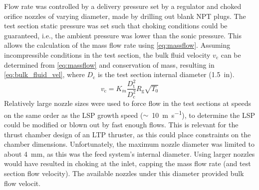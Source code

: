         Flow rate was controlled by a delivery pressure set by a regulator and choked orifice nozzles of varying diameter, made by drilling out blank NPT plugs. The test section static pressure was set such that choking conditions could be guaranteed, i.e., the ambient pressure was lower than the sonic pressure. This allows the calculation of the mass flow rate using \autoref{eq:massflow}.
        Assuming incompressible conditions in the test section, the bulk fluid velocity $v_\mathrm{c}$ can be determined from \autoref{eq:massflow} and conservation of mass, resulting in \autoref{eq:bulk_fluid_vel}, where $D_\mathrm{c}$ is the test section internal diameter (\qty{1.5}{in}).
        \begin{equation} \label{eq:bulk_fluid_vel}
            v_\mathrm{c} = K_{\dot{m}}\frac{D_\mathrm{t}^2}{D_\mathrm{c}^2}R_\mathrm{g}\sqrt{T_0}
        \end{equation}
        Relatively large nozzle sizes were used to force flow in the test sections at speeds on the same order as the LSP growth speed ($\sim$~\qty{10}{m.s^{-1}}), to determine the LSP could be modified or blown out by fast enough flows. This is relevant for the thrust chamber design of an LTP thruster, as this could place constraints on the chamber dimensions. Unfortunately, the maximum nozzle diameter was limited to about \qty{4}{mm}, as this was the feed system's internal diameter. Using larger nozzles would have resulted in choking at the inlet, capping the mass flow rate (and test section flow velocity). The available nozzles under this diameter  provided  bulk flow velocit.

